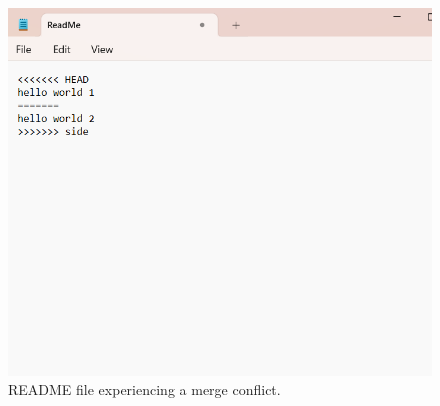 \documentclass[10pt]{article}
\begin{document}
\begin{figure}
    \includegraphics[width=.6\linewidth]{conflict.png}
\centering
    \caption{
        README file experiencing a merge conflict.
    }
    \label{fig:Fig4}
\end{figure}
\end{document}
